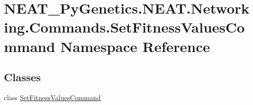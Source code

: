 \hypertarget{namespaceNEAT__PyGenetics_1_1NEAT_1_1Networking_1_1Commands_1_1SetFitnessValuesCommand}{}\section{N\+E\+A\+T\+\_\+\+Py\+Genetics.\+N\+E\+A\+T.\+Networking.\+Commands.\+Set\+Fitness\+Values\+Command Namespace Reference}
\label{namespaceNEAT__PyGenetics_1_1NEAT_1_1Networking_1_1Commands_1_1SetFitnessValuesCommand}
\subsection*{Classes}
\begin{DoxyCompactItemize}
\item 
class \hyperlink{classNEAT__PyGenetics_1_1NEAT_1_1Networking_1_1Commands_1_1SetFitnessValuesCommand_1_1SetFitnessValuesCommand}{Set\+Fitness\+Values\+Command}
\end{DoxyCompactItemize}
